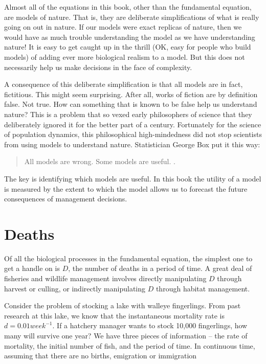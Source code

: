 \documentclass[]{book}
\begin{document}
Almost all of the equations in this book, other than the fundamental
equation, are models of nature. That is, they are deliberate
simplifications of what is really going on out in nature. If our models
were exact replicas of nature, then we would have as much trouble
understanding the model as we have understanding nature! It is easy to
get caught up in the thrill (OK, easy for people who build models) of
adding ever more biological realism to a model. But this does not
necessarily help us make decisions in the face of complexity.

A consequence of this deliberate simplification is that all models are
in fact, fictitious. This might seem surprising. After all, works of
fiction are by definition false. Not true. How can something that is
known to be false help us understand nature? This is a problem that so
vexed early philosophers of science that they deliberately ignored it
for the better part of a century. Fortunately for the science of
population dynamics, this philosophical high-mindedness did not stop
scientists from using models to understand nature. Statistician George
Box put it this way:

\begin{quote}
All models are wrong. Some models are useful. \citep{box1976science}.
\end{quote}

The key is identifying which models are useful. In this book the utility
of a model is measured by the extent to which the model allows us to
forecast the future consequences of management decisions.

\section{Deaths}\label{deaths}

Of all the biological processes in the fundamental equation, the
simplest one to get a handle on is \(D\), the number of deaths in a
period of time. A great deal of fisheries and wildlife management
involves directly manipulating \(D\) through harvest or culling, or
indirectly manipulating \(D\) through habitat management.

Consider the problem of stocking a lake with walleye fingerlings. From
past research at this lake, we know that the instantaneous mortality
rate is \(d = 0.01 week^{-1}\). If a hatchery manager wants to stock
10,000 fingerlings, how many will survive one year? We have three pieces
of information -- the rate of mortality, the initial number of fish, and
the period of time. In continuous time, assuming that there are no
births, emigration or immigration
\end{document}
